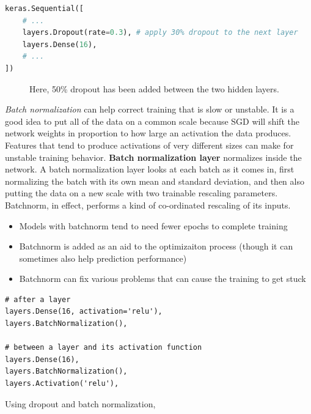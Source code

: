 \begin{lstlisting}[language=Python]
keras.Sequential([
    # ...
    layers.Dropout(rate=0.3), # apply 30% dropout to the next layer
    layers.Dense(16),
    # ...
])
\end{lstlisting}

\pagebreak

\begin{figure}[htp]
	\centering
	\caption{Here, 50\% dropout has been added between the two hidden layers.}
\end{figure}


\noindent \emph{Batch normalization} can help correct training that is slow or unstable. It
is a good idea to put all of the data on a common scale because SGD will shift the network
weights in proportion to how large an activation the data produces. Features that tend to
produce activations of very different sizes can make for unstable training behavior.
\textbf{Batch normalization layer} normalizes inside the network. A batch normalization layer
looks at each batch as it comes in, first normalizing the batch with its own mean and
standard deviation, and then also putting the data on a new scale with two trainable
rescaling parameters. Batchnorm, in effect, performs a kind of co-ordinated rescaling of its
inputs. 
\begin{itemize}
	\item Models with batchnorm tend to need fewer epochs to complete training
	\item Batchnorm is added as an aid to the optimizaiton process (though it can
		sometimes also help prediction performance)
	\item Batchnorm can fix various problems that can cause the training to get stuck
\end{itemize}

\begin{lstlisting}
# after a layer
layers.Dense(16, activation='relu'),
layers.BatchNormalization(),

# between a layer and its activation function
layers.Dense(16),
layers.BatchNormalization(),
layers.Activation('relu'),
\end{lstlisting}

\vspace{0.5cm}

\noindent Using dropout and batch normalization,

